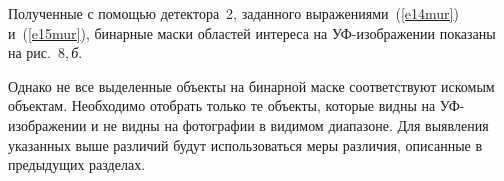 \begin{multicols}{2}
  Полученные с помощью детектора~2, заданного 
  выражениями~(\ref{e14mur}) и~(\ref{e15mur}), бинарные маски областей интереса на 
  УФ-изоб\-ра\-же\-нии показаны на рис.~8,\,\textit{б}.


  
  Однако не все выделенные объекты на бинарной маске соответствуют искомым объектам. 
Необходимо отобрать только те объекты, которые видны на УФ-изоб\-ра\-же\-нии и не 
видны на фотографии в видимом диапазоне. Для выявления указанных выше различий будут 
использоваться меры различия, описанные в предыдущих разделах. 

\end{multicols}

\begin{figure}[b] %
       \vspace*{1pt}
 \begin{center}
 \mbox{%
 \epsfxsize=138mm %
 }
 \end{center}
 \vspace*{-11pt}
       \vspace*{4pt}
 \begin{center}
 \mbox{%
 \epsfxsize=138mm %
 }
 \end{center}
 \vspace*{-11pt}
\end{figure}


